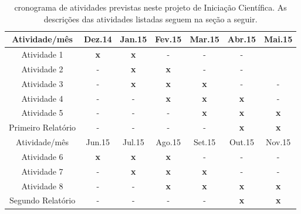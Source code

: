 \documentclass[12pt]{article}
\begin{document}
  \begin{table}[!ht]
    \caption{cronograma de atividades previstas neste projeto de Iniciação Científica. As descrições das atividades listadas seguem na seção a seguir.} \label{tab:cronograma}
    \begin{center}
      \smallskip
      \begin{tabular}{c ccc ccc}
        \toprule
        \small Atividade/mês & \small Dez.14 & \small Jan.15 & \small Fev.15 & \small Mar.15 &  \small Abr.15 & \small Mai.15\\ \hline

        \small Atividade 1   & \small {\bf x} & \small {\bf x} & \small - & \small - & \small - \\

        \small Atividade 2   & \small - & \small {\bf x} & \small {\bf x} & \small - & \small - \\
        
        \small Atividade 3   & \small - & \small {\bf x} & \small {\bf x} & \small {\bf x} & \small - &  \small - \\
        
        \small Atividade 4   & \small - & \small - & \small {\bf x} & \small {\bf x} & \small {\bf x} &  \small - \\
        
        \small Atividade 5   & \small - & \small - & \small - & \small {\bf x} & \small {\bf x} &  \small {\bf x} \\
        
        \small Primeiro Relatório   & \small - & \small - & \small - & \small - & \small {\bf x} &  \small {\bf x} \\
        \bottomrule
        \toprule
\small Atividade/mês & \small Jun.15 & \small Jul.15 & \small Ago.15 & \small Set.15 &  \small Out.15 & \small Nov.15\\ \hline
        \small Atividade 6   & \small {\bf x} & \small {\bf x} & \small {\bf x} & \small - & \small - &  \small -\\
        
        \small Atividade 7  & \small - & \small {\bf x} & \small {\bf x} & {\bf x} & \small - &  \small -\\
        
        \small Atividade 8  & \small - & \small - & \small {\bf x} & \small {\bf x} & \small {\bf x} &  \small {\bf x}\\
        
        \small Segundo Relatório   &  \small - & \small - & \small - & \small - & \small {\bf x} &  \small {\bf x}\\
        \bottomrule
      \end{tabular}
    \end{center}
  \end{table}
\end{document}
